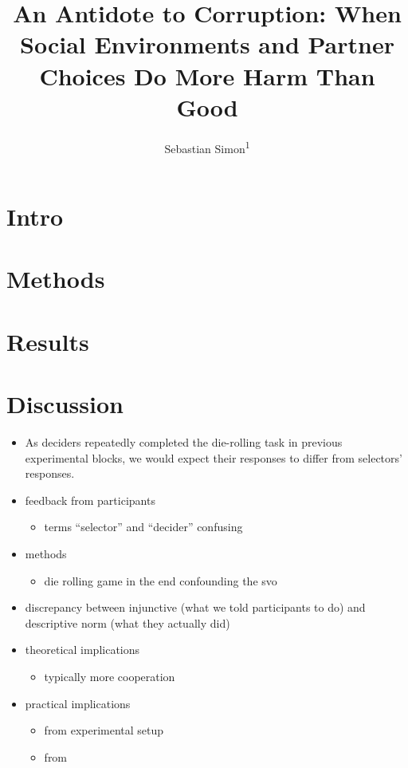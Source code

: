 \documentclass[
  man]{apa6}
\affiliation{
\vspace{0.5cm}
\textsuperscript{1} Social, Economic, and Organizational Psychology, Leiden University}
\title{An Antidote to Corruption: When Social Environments and Partner Choices Do More Harm Than Good}
\author{Sebastian Simon\textsuperscript{1}}
\date{}
\providecommand{\tightlist}{%
  \setlength{\itemsep}{0pt}\setlength{\parskip}{0pt}}
\begin{document}
\maketitle

\hypertarget{intro}{%
\section{Intro}\label{intro}}

\hypertarget{methods}{%
\section{Methods}\label{methods}}

\hypertarget{results}{%
\section{Results}\label{results}}

\hypertarget{discussion}{%
\section{Discussion}\label{discussion}}

\begin{itemize}
\tightlist
\item
  As deciders repeatedly completed the die-rolling task in previous experimental blocks, we would expect their responses to differ from selectors' responses.
\item
  feedback from participants

  \begin{itemize}
  \tightlist
  \item
    terms \enquote{selector} and \enquote{decider} confusing
  \end{itemize}
\item
  methods

  \begin{itemize}
  \tightlist
  \item
    die rolling game in the end confounding the svo
  \end{itemize}
\item
  discrepancy between injunctive (what we told participants to do) and descriptive norm (what they actually did)
\item
  theoretical implications

  \begin{itemize}
  \tightlist
  \item
    typically more cooperation
  \end{itemize}
\item
  practical implications

  \begin{itemize}
  \tightlist
  \item
    from experimental setup
  \item
    from
  \end{itemize}
\end{itemize}
\end{document}
